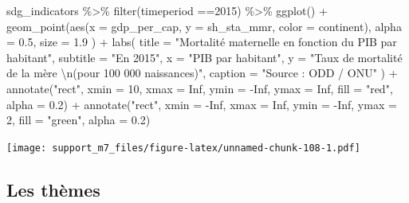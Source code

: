 \documentclass[
]{book}
\newenvironment{Shaded}{\begin{snugshade}}{\end{snugshade}}
\newcommand{\AttributeTok}[1]{\textcolor[rgb]{0.77,0.63,0.00}{#1}}
\newcommand{\ConstantTok}[1]{\textcolor[rgb]{0.00,0.00,0.00}{#1}}
\newcommand{\DecValTok}[1]{\textcolor[rgb]{0.00,0.00,0.81}{#1}}
\newcommand{\FloatTok}[1]{\textcolor[rgb]{0.00,0.00,0.81}{#1}}
\newcommand{\FunctionTok}[1]{\textcolor[rgb]{0.00,0.00,0.00}{#1}}
\newcommand{\NormalTok}[1]{#1}
\newcommand{\SpecialCharTok}[1]{\textcolor[rgb]{0.00,0.00,0.00}{#1}}
\newcommand{\StringTok}[1]{\textcolor[rgb]{0.31,0.60,0.02}{#1}}
\begin{document}
\begin{Shaded}
\begin{Highlighting}[]
\NormalTok{sdg\_indicators }\SpecialCharTok{\%\textgreater{}\%} 
  \FunctionTok{filter}\NormalTok{(timeperiod }\SpecialCharTok{==}\DecValTok{2015}\NormalTok{) }\SpecialCharTok{\%\textgreater{}\%} 
  \FunctionTok{ggplot}\NormalTok{() }\SpecialCharTok{+}
  \FunctionTok{geom\_point}\NormalTok{(}\FunctionTok{aes}\NormalTok{(}\AttributeTok{x =}\NormalTok{ gdp\_per\_cap, }
                 \AttributeTok{y =}\NormalTok{ sh\_sta\_mmr,}
                 \AttributeTok{color =}\NormalTok{ continent),}
    \AttributeTok{alpha =} \FloatTok{0.5}\NormalTok{, }
    \AttributeTok{size =} \FloatTok{1.9}
\NormalTok{  ) }\SpecialCharTok{+}
  \FunctionTok{labs}\NormalTok{(}
    \AttributeTok{title =} \StringTok{"Mortalité maternelle en fonction du PIB par habitant"}\NormalTok{,}
    \AttributeTok{subtitle =} \StringTok{"En 2015"}\NormalTok{,}
    \AttributeTok{x =} \StringTok{"PIB par habitant"}\NormalTok{,}
    \AttributeTok{y =} \StringTok{"Taux de mortalité de la mère }\SpecialCharTok{\textbackslash{}n}\StringTok{(pour 100 000 naissances)"}\NormalTok{,}
    \AttributeTok{caption =} \StringTok{"Source : ODD / ONU"}
\NormalTok{  ) }\SpecialCharTok{+}
  \FunctionTok{annotate}\NormalTok{(}\StringTok{"rect"}\NormalTok{, }\AttributeTok{xmin =} \DecValTok{10}\NormalTok{, }\AttributeTok{xmax =} \ConstantTok{Inf}\NormalTok{, }\AttributeTok{ymin =} \SpecialCharTok{{-}}\ConstantTok{Inf}\NormalTok{, }\AttributeTok{ymax =} \ConstantTok{Inf}\NormalTok{, }\AttributeTok{fill =} \StringTok{"red"}\NormalTok{, }\AttributeTok{alpha =} \FloatTok{0.2}\NormalTok{) }\SpecialCharTok{+}
  \FunctionTok{annotate}\NormalTok{(}\StringTok{"rect"}\NormalTok{, }\AttributeTok{xmin =} \SpecialCharTok{{-}}\ConstantTok{Inf}\NormalTok{, }\AttributeTok{xmax =} \ConstantTok{Inf}\NormalTok{, }\AttributeTok{ymin =} \SpecialCharTok{{-}}\ConstantTok{Inf}\NormalTok{, }\AttributeTok{ymax =} \DecValTok{2}\NormalTok{, }\AttributeTok{fill =} \StringTok{"green"}\NormalTok{, }\AttributeTok{alpha =} \FloatTok{0.2}\NormalTok{)}
\end{Highlighting}
\end{Shaded}

\texttt{[image: support\_m7\_files/figure-latex/unnamed-chunk-108-1.pdf]}

\hypertarget{les-thuxe8mes}{%
\subsection{Les thèmes}\label{les-thuxe8mes}}
\end{document}
